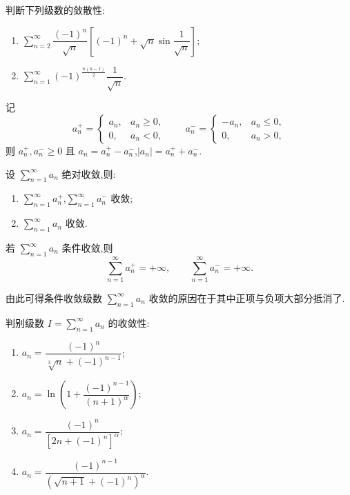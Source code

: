 \documentclass[../数学分析培优讲义.tex]{subfiles}
\begin{document}
\begin{example}
判断下列级数的敛散性:
\begin{enumerate}[label=(\arabic*)]
    \item $\displaystyle\sum\limits_{n=2}^{\infty}\dfrac{(-1)^n}{\sqrt n}
    \left[(-1)^n+\sqrt n\sin\dfrac{1}{\sqrt n}\right]$;
    \item $\displaystyle\sum\limits_{n=1}^{\infty}(-1)^{\frac{n(n-1)}{2}}\dfrac{1}{\sqrt n}$.
\end{enumerate}
\end{example}
\exampleblank

记
\[
    a_n^+=\begin{cases}a_n,&a_n\geq0,\\0,&a_n<0,
    \end{cases}
    \qquad
    a_n^-=\begin{cases}-a_n,&a_n\leq0,\\0,&a_n>0,
    \end{cases}
\]
则 $a_n^+,a_n^-\geq0$ 且 $a_n=a_n^+-a_n^-$,$|a_n|=a_n^++a_n^-$.

\begin{theorem}[\markstar]
设 $\displaystyle\sum\limits_{n=1}^{\infty}a_n$ 绝对收敛,则:
\begin{enumerate}[label=(\arabic*)]
    \item $\displaystyle\sum\limits_{n=1}^{\infty}a_n^+$,$\displaystyle\sum\limits_{n=1}^{\infty}a_n^-$ 收敛;
    \item $\displaystyle\sum\limits_{n=1}^{\infty}a_n$ 收敛.
\end{enumerate}
\end{theorem}

\begin{corollary}[\markstar]
若 $\displaystyle\sum\limits_{n=1}^{\infty}a_n$ 条件收敛,则
\[
    \sum\limits_{n=1}^{\infty}a_n^+=+\infty,
    \qquad
    \sum\limits_{n=1}^{\infty}a_n^-=+\infty.
\]
\end{corollary}

\begin{remark}
由此可得条件收敛级数 $\displaystyle\sum\limits_{n=1}^{\infty}a_n$ 收敛的原因在于其中正项与负项大部分抵消了.
\end{remark}

\begin{example}
判别级数 $\displaystyle I=\sum\limits_{n=1}^{\infty}a_n$ 的收敛性:
\begin{enumerate}[label=(\arabic*)]
    \item $\displaystyle a_n=\dfrac{(-1)^n}{\sqrt[3]{n}+(-1)^{n-1}}$;
    \item $\displaystyle a_n=\ln\left(1+\dfrac{(-1)^{n-1}}{(n+1)^\alpha}\right)$;
    \item $\displaystyle a_n=\dfrac{(-1)^n}{[2n+(-1)^n]^\alpha}$;
    \item $\displaystyle a_n=\dfrac{(-1)^{n-1}}{(\sqrt{n+1}+(-1)^n)^\alpha}$.
\end{enumerate}
\end{example}
\exampleblank
\end{document}
